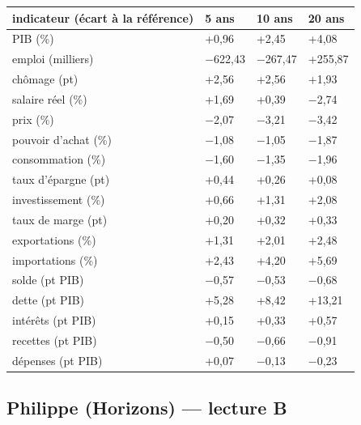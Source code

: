 \documentclass[
  11pt,
  11pt,
  a4paper,
  openany]{book}
\begin{document}
\begin{longtable}[]{@{}llll@{}}
\toprule\noalign{}
indicateur (écart à la référence) & 5 ans & 10 ans & 20 ans \\
\midrule\noalign{}
\endhead
\bottomrule\noalign{}
\endlastfoot
PIB (\%) & +0,96 & +2,45 & +4,08 \\
emploi (milliers) & −622,43 & −267,47 & +255,87 \\
chômage (pt) & +2,56 & +2,56 & +1,93 \\
salaire réel (\%) & +1,69 & +0,39 & −2,74 \\
prix (\%) & −2,07 & −3,21 & −3,42 \\
pouvoir d'achat (\%) & −1,08 & −1,05 & −1,87 \\
consommation (\%) & −1,60 & −1,35 & −1,96 \\
taux d'épargne (pt) & +0,44 & +0,26 & +0,08 \\
investissement (\%) & +0,66 & +1,31 & +2,08 \\
taux de marge (pt) & +0,20 & +0,32 & +0,33 \\
exportations (\%) & +1,31 & +2,01 & +2,48 \\
importations (\%) & +2,43 & +4,20 & +5,69 \\
solde (pt PIB) & −0,57 & −0,53 & −0,68 \\
dette (pt PIB) & +5,28 & +8,42 & +13,21 \\
intérêts (pt PIB) & +0,15 & +0,33 & +0,57 \\
recettes (pt PIB) & −0,50 & −0,66 & −0,91 \\
dépenses (pt PIB) & +0,07 & −0,13 & −0,23 \\
\end{longtable}

\hypertarget{philippe-horizons-lecture-b}{%
\subsection{Philippe (Horizons) --- lecture
B}\label{philippe-horizons-lecture-b}}
\end{document}
